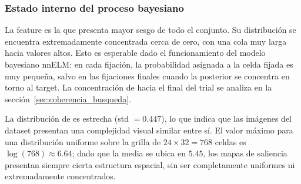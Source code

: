 \subsubsection{Estado interno del proceso bayesiano}


La feature  es la que presenta mayor sesgo de todo el conjunto. Su distribución se encuentra extremadamente concentrada cerca de cero, con una cola muy larga hacia valores altos. Esto es esperable dado el funcionamiento del modelo bayesiano nnELM: en cada fijación, la probabilidad asignada a la celda fijada es muy pequeña, salvo en las fijaciones finales cuando la posterior se concentra en torno al target. La concentración de  hacia el final del trial se analiza en la sección~\ref{sec:coherencia_busqueda}.

\begin{table}[H]
\centering
\caption{Estadísticos descriptivos de las features dinámicas del estado interno (parte I).}
\label{tab:dist_bayesiano_a}
\small
\setlength{\tabcolsep}{4pt}
\renewcommand{\arraystretch}{1.2}
\end{table}

La distribución de  es estrecha (std $= 0.447$), lo que indica que las imágenes del dataset presentan una complejidad visual similar entre sí. El valor máximo para una distribución uniforme sobre la grilla de $24 \times 32 = 768$ celdas es $\log(768) \approx 6.64$; dado que la media se ubica en $5.45$, los mapas de saliencia presentan siempre cierta estructura espacial, sin ser completamente uniformes ni extremadamente concentrados.

